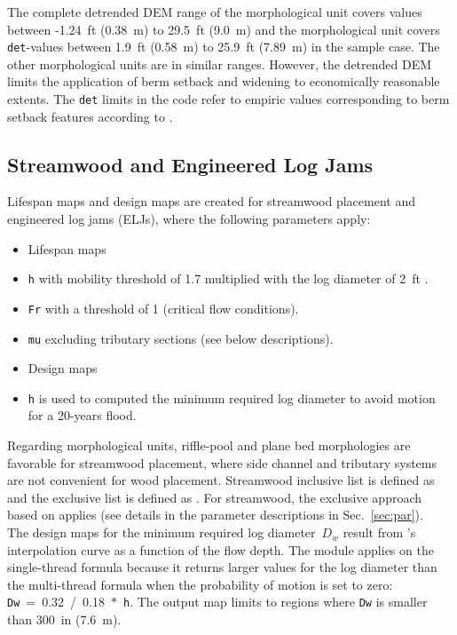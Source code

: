 The complete detrended DEM range of the morphological unit  covers values between -1.24~ft (0.38~m) to 29.5~ft (9.0~m) and the morphological unit  covers \texttt{det}-values between 1.9~ft (0.58~m) to 25.9~ft (7.89~m) in the sample case. The other morphological units are in similar ranges. However, the detrended DEM limits the application of berm setback and widening to economically reasonable extents. The \texttt{det} limits in the code refer to empiric values corresponding to berm setback features according to \citep{ycwa16}.


\subsection{Streamwood and Engineered Log Jams}\label{sec:ejl}
Lifespan maps and design maps are created for streamwood placement and engineered log jams (ELJs), where the following parameters apply:

\begin{itemize}
	\item[] Lifespan maps
	\item \texttt{h} with mobility threshold of 1.7 multiplied with the log diameter of 2~ft \citep[0.6~m][]{lange06, ycwa16}.
	\item \texttt{Fr} with a threshold of 1 (critical flow conditions).
	\item \texttt{mu} excluding tributary sections (see below descriptions).
	\item[] Design maps
	\item \texttt{h} is used to computed the minimum required log diameter to avoid motion for a 20-years flood.
\end{itemize}

Regarding morphological units, riffle-pool and plane bed morphologies are favorable for streamwood placement, where side channel and tributary systems are not convenient for wood placement. Streamwood inclusive list is defined as \pythoninline{mu_good = ["riffle", "riffle transition", "pool", "floodplain", "island floodplain", "lateral bar", "medial bar",}\\
\pythoninline{" run"]} and the exclusive list is defined as . For streamwood, the exclusive approach based on  applies (see details in the parameter descriptions in Sec.~\ref{sec:par}).\\

The design maps for the minimum required log diameter~$D_w$ result from \citep{ruiz16b}'s interpolation curve as a function of the flow depth. The module applies on the single-thread formula because it returns larger values for the log diameter than the multi-thread formula when the probability of motion is set to zero: \texttt{Dw}~=~0.32~/~0.18~$*$~\texttt{h}. The output map limits to regions where \texttt{Dw} is smaller than 300~in (7.6~m).

